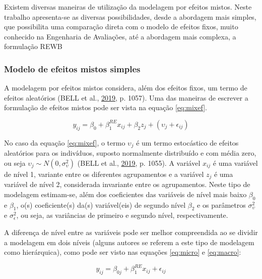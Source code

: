 \documentclass[
  a4paper, 12pt]{article}
\begin{document}
Existem diversas maneiras de utilização da modelagem por efeitos mistos.
Neste trabalho apresenta-se as diversas possibilidades, desde a
abordagem mais simples, que possibilita uma comparação direta com o
modelo de efeitos fixos, muito conhecido na Engenharia de Avaliações,
até a abordagem mais complexa, a formulação REWB

\hypertarget{modelo-de-efeitos-mistos-simples}{%
\subsubsection{Modelo de efeitos mistos
simples}\label{modelo-de-efeitos-mistos-simples}}

A modelagem por efeitos mistos considera, além dos efeitos fixos, um
termo de efeitos aleatórios (BELL et al.,
\protect\hyperlink{ref-bell2019}{2019}, p. 1057). Uma das maneiras de
escrever a formulação de efeitos mistos pode ser vista na equação
\ref{eq:mixef}.

\begin{equation} \label{eq:mixef}
y_{ij} = \beta_0 + \beta_1^{RE} x_{ij} + \beta_2 z_j + (\upsilon_j + \epsilon_{ij}) 
\end{equation}

No caso da equação \ref{eq:mixef}, o termo \(\upsilon_j\) é um termo
estocástico de efeitos aleatórios para os indivíduos, suposto
normalmente distribuído e com média zero, ou seja
\(\upsilon_j \sim N(0, \sigma_{\upsilon}^2)\) (BELL et al.,
\protect\hyperlink{ref-bell2019}{2019}, p. 1055). A variável \(x_{ij}\)
é uma variável de nível 1, variante entre os diferentes agrupamentos e a
variável \(z_j\) é uma variável de nível 2, considerada invariante entre
os agrupamentos. Neste tipo de modelagem estimam-se, além dos
coeficientes das variáveis de nível mais baixo \(\beta_0\) e
\(\beta_1\), o(s) coeficiente(s) da(s) variável(eis) de segundo nível
\(\beta_2\) e os parâmetros \(\sigma_\upsilon^2\) e
\(\sigma_\epsilon^2\), ou seja, as variâncias de primeiro e segundo
nível, respectivamente.

A diferença de nível entre as variáveis pode ser melhor compreendida ao
se dividir a modelagem em dois níveis (alguns autores se referem a este
tipo de modelagem como hierárquica), como pode ser visto nas equações
\ref{eq:micro} e \ref{eq:macro}:

\begin{equation} \label{eq:micro}
y_{ij} = \beta_{0j} + \beta_1^{RE} x_{ij} + \epsilon_{ij} 
\end{equation}
\end{document}
